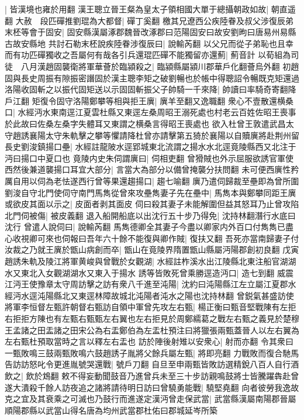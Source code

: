 |{
	皆漢境也雍於用翻}
漢王聰立晉王粲為皇太子領相國大單于總攝朝政如故|{
	朝直遥翻}
大赦　段匹磾推劉琨為大都督|{
	磾丁奚翻}
檄其兄遼西公疾陸眷及叔父涉復辰弟末柸等會于固安|{
	固安縣漢屬涿郡魏晉改涿郡曰范陽固安曰故安劉昫曰唐易州易縣古故安縣地}
共討石勒末柸說疾陸眷涉復辰曰|{
	說輸芮翻}
以父兄而從子弟恥也且幸而有功匹磾獨收之吾屬何有哉各引兵還琨匹磾不能獨留亦還薊|{
	薊音計}
以荀組為司徒　八月漢趙固襲衛將軍華薈於臨潁殺之|{
	臨潁縣屬潁川郡華戶化翻薈烏外翻}
初趙固與長史周振有隙振密譖固於漢主聰李矩之破劉暢也於帳中得聰詔令暢既克矩還過洛陽收固斬之以振代固矩送以示固固斬振父子帥騎一千來降|{
	帥讀曰率騎奇寄翻降戶江翻}
矩復令固守洛陽鄭攀等相與拒王廙|{
	廙羊至翻又逸職翻}
衆心不壹散還横桑口|{
	水經沔水東南逕江夏雲杜縣又東逕左桑周昭王溺死處也村老云百姓佐昭王喪事於此故曰佐桑左桑字失體耳又東謂之横桑言得昭王喪處也}
欲入杜曾王敦遣武昌太守趙誘襄陽太守朱軌擊之攀等懼請降杜曾亦請擊第五猗於襄陽以自贖廙將赴荆州留長史劉浚鎮揚口壘|{
	水經註龍陂水逕郢城東北流謂之揚水水北逕竟陵縣西又北注于沔曰揚口中夏口也}
竟陵内史朱伺謂廙曰|{
	伺相吏翻}
曾猾賊也外示屈服欲誘官軍使西然後兼道襲揚口耳宜大部分|{
	言當大為部分以備曾掩襲分扶問翻}
未可便西廙性矜厲自用以伺為老怯遂西行曾等果還趨揚口|{
	趨七喻翻}
廙乃遣伺歸裁至壘即為曾所圍劉浚自守北門使伺守南門馬雋從曾來攻壘雋妻子先在壘中|{
	馬雋本與鄭攀同距王廙}
或欲皮其面以示之|{
	皮面者剥其面皮}
伺曰殺其妻子未能解圍但益其怒耳乃止曾攻陷北門伺被傷|{
	被皮義翻}
退入船開船底以出沈行五十步乃得免|{
	沈持林翻潛行水底曰沈行}
曾遣人說伺曰|{
	說輸芮翻}
馬雋德卿全其妻子今盡以卿家内外百口付雋雋已盡心收視卿可來也伺報曰吾年六十餘不能復與卿作賊|{
	復扶又翻}
吾死亦當南歸妻子付汝裁之乃就王廙於甑山病創而卒|{
	甑山在竟陵界隋置甑山縣屬沔陽郡創初良翻}
戊寅趙誘朱軌及陵江將軍黄峻與曾戰於女觀湖|{
	水經註柞溪水出江陵縣北東注船官湖湖水又東北入女觀湖湖水又東入于揚水}
誘等皆敗死曾乘勝逕造沔口|{
	造七到翻}
威震江沔王使豫章太守周訪擊之訪有衆八千進至沌陽|{
	沈約曰沌陽縣江左立屬江夏郡水經沔水逕沌陽縣北又東逕林障故城北沌陽者沌水之陽也沈持林翻}
曾鋭氣甚盛訪使將軍李恒督左甄許朝督右甄訪自領中軍曾先攻左右甄|{
	楊正衡曰甄音堅戰陳有左拒右拒拒方陳也有左甄右甄甄左右翼也左右拒見於周鄭繻葛之戰左右甄之義見於楚穆王孟諸之田盂諸之田宋公為右盂鄭伯為左盂杜預注曰將獵張兩甄蓋晉人以左右翼為左右甄杜預取當時之言以釋左右盂也}
訪於陣後射雉以安衆心|{
	射而亦翻}
令其衆曰一甄敗鳴三鼓兩甄敗鳴六鼓趙誘子胤將父餘兵屬左甄|{
	將即亮翻}
力戰敗而復合馳馬告訪訪怒叱令更進胤號哭還戰|{
	號戶刀翻}
自旦至申兩甄皆敗訪選精銳八百人自行酒飲之|{
	飲於鴆翻}
敕不得妄動聞鼓音乃進曾兵未至三十步訪親鳴鼓將士皆騰躍犇赴曾遂大潰殺千餘人訪夜追之諸將請待明日訪曰曾驍勇能戰|{
	驍堅堯翻}
向者彼勞我逸故克之宜及其衰乘之可滅也乃鼓行而進遂定漢沔曾走保武當|{
	武當縣漢屬南陽郡晉屬順陽郡縣以武當山得名唐為均州武當郡杜佑曰郡城延岑所築}
